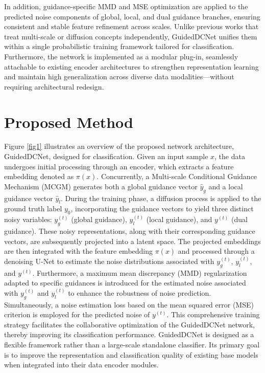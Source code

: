 \documentclass[a4paper,fleqn]{cas-sc}
\begin{document}
In addition, guidance-specific MMD and MSE optimization are applied to the predicted noise components of global, local, and dual guidance branches, ensuring consistent and stable feature refinement across scales. Unlike previous works that treat multi-scale or diffusion concepts independently, GuidedDCNet unifies them within a single probabilistic training framework tailored for classification. Furthermore, the network is implemented as a modular plug-in, seamlessly attachable to existing encoder architectures to strengthen representation learning and maintain high generalization across diverse data modalities—without requiring architectural redesign.

\section{Proposed Method}
Figure \ref{fig1} illustrates an overview of the proposed network architecture, GuidedDCNet, designed for classification. Given an input sample \( x \), the data undergoes initial processing through an encoder, which extracts a feature embedding denoted as \( \pi(x) \). Concurrently, a Multi-scale Conditional Guidance Mechanism (MCGM) generates both a global guidance vector \( \hat{y}_g \) and a local guidance vector \( \hat{y}_l \). During the training phase, a diffusion process is applied to the ground truth label \( y_0 \), incorporating the guidance vectors to yield three distinct noisy variables: \( y_g^{(t)} \) (global guidance), \( y_l^{(t)} \) (local guidance), and \( y^{(t)} \) (dual guidance). These noisy representations, along with their corresponding guidance vectors, are subsequently projected into a latent space. The projected embeddings are then integrated with the feature embedding \( \pi(x) \) and processed through a denoising U-Net to estimate the noise distributions associated with \( y_g^{(t)} \), \( y_l^{(t)} \), and \( y^{(t)} \). Furthermore, a maximum mean discrepancy (MMD) regularization adapted to specific guidances is introduced for the estimated noise associated with \( y_g^{(t)} \) and \( y_l^{(t)} \) to enhance the robustness of noise prediction. Simultaneously, a noise estimation loss based on the mean squared error (MSE) criterion is employed for the predicted noise of \( y^{(t)} \). This comprehensive training strategy facilitates the collaborative optimization of the GuidedDCNet network, thereby improving its classification performance. GuidedDCNet is designed as a flexible framework rather than a large-scale standalone classifier. Its primary goal is to improve the representation and classification quality of existing base models when integrated into their data encoder modules. 
\end{document}
